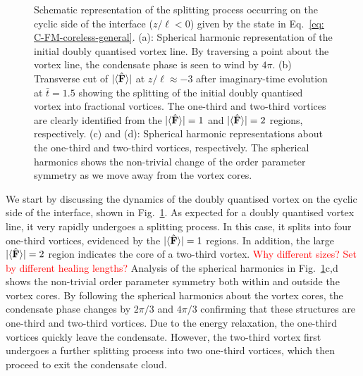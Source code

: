 \begin{figure}
    \caption{\label{fig: C-FM-coreless-cyclic}Schematic representation of the
        splitting process occurring on the cyclic side of the interface
        (\(z/\ell < 0\)) given by the state in
        Eq.~\eqref{eq: C-FM-coreless-general}.
        (a): Spherical harmonic representation of the initial doubly quantised
        vortex line. By traversing a point about the vortex line, the condensate
        phase is seen to wind by \(4\pi \).
        (b) Transverse cut of \(|\langle \hat{\vb{F}} \rangle | \) at \(z/\ell \approx -3\) after
        imaginary-time evolution at \(\bar{t} = 1.5\) showing the splitting of
        the initial doubly quantised vortex into fractional vortices.
        The one-third and two-third vortices are clearly identified from the
        \(|\langle \hat{\vb{F}} \rangle | = 1\) and \(|\langle \hat{\vb{F}} \rangle | = 2\) regions, respectively.
        (c) and (d): Spherical harmonic representations about the one-third and
        two-third vortices, respectively.
        The spherical harmonics shows the non-trivial change of the order
        parameter symmetry as we move away from the vortex cores.}
\end{figure}
We start by discussing the dynamics of the doubly quantised vortex on the cyclic
side of the interface, shown in Fig.~\ref{fig: C-FM-coreless-cyclic}.
As expected for a doubly quantised vortex line, it very rapidly undergoes a
splitting process.
In this case, it splits into four one-third vortices, evidenced by the
\(|\langle \hat{\vb{F}} \rangle | = 1\) regions.
In addition, the large \(|\langle \hat{\vb{F}} \rangle | = 2\) region indicates the core of a two-third
vortex.
\textcolor{red}{Why different sizes? Set by different healing lengths?}
Analysis of the spherical harmonics in Fig.~\ref{fig: C-FM-coreless-cyclic}c,d
shows the non-trivial order parameter symmetry both within and outside the
vortex cores.
By following the spherical harmonics about the vortex cores, the condensate
phase changes by \(2\pi/3\) and \(4\pi/3\) confirming that these structures are
one-third and two-third vortices.
Due to the energy relaxation, the one-third vortices quickly leave the
condensate.
However, the two-third vortex first undergoes a further splitting process into
two one-third vortices, which then proceed to exit the condensate cloud.

